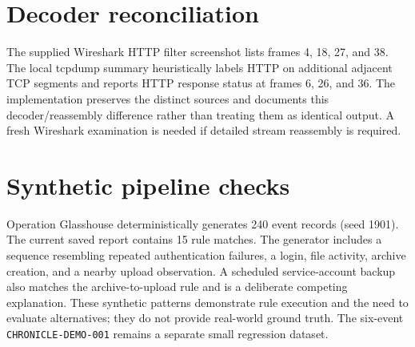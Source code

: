 \documentclass[12pt,a4paper]{report}
\newcommand{\caseid}[1]{\texttt{#1}}
\begin{document}
\section{Decoder reconciliation}
The supplied Wireshark HTTP filter screenshot lists frames 4, 18, 27, and 38. The local tcpdump summary heuristically labels HTTP on additional adjacent TCP segments and reports HTTP response status at frames 6, 26, and 36. The implementation preserves the distinct sources and documents this decoder/reassembly difference rather than treating them as identical output. A fresh Wireshark examination is needed if detailed stream reassembly is required.

\section{Synthetic pipeline checks}
Operation Glasshouse deterministically generates 240 event records (seed 1901). The current saved report contains 15 rule matches. The generator includes a sequence resembling repeated authentication failures, a login, file activity, archive creation, and a nearby upload observation. A scheduled service-account backup also matches the archive-to-upload rule and is a deliberate competing explanation. These synthetic patterns demonstrate rule execution and the need to evaluate alternatives; they do not provide real-world ground truth. The six-event \caseid{CHRONICLE-DEMO-001} remains a separate small regression dataset.
\end{document}
